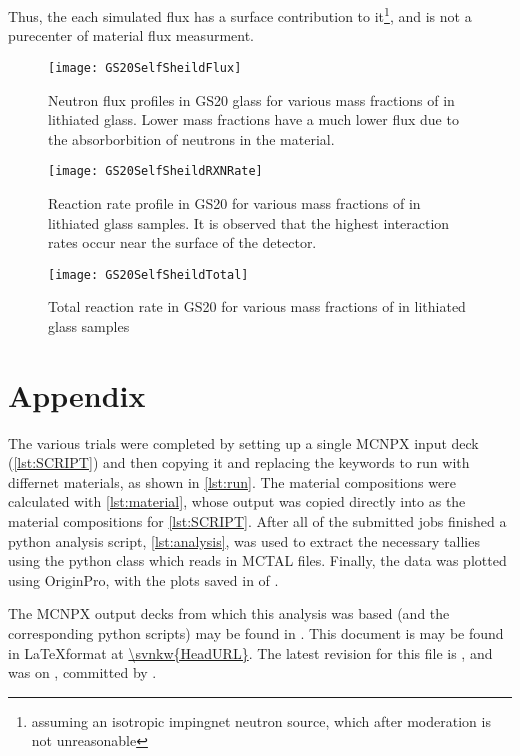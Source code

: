 \documentclass[draftcls,onecolumn]{IEEEtran}
\begin{document}
Thus, the each simulated flux has a surface contribution to it\footnote{assuming an isotropic impingnet neutron source, which after moderation is not unreasonable}, and is not a purecenter of material flux measurment.
\begin{figure}
	\texttt{[image: GS20SelfSheildFlux]}
	\caption[Flux Profile through GS20]{Neutron flux profiles in GS20 glass for various mass fractions of  in lithiated glass. Lower mass fractions have a much lower flux due to the absorborbition of neutrons in the material.}
	\label{fig:Flux}
\end{figure}
\begin{figure}
	\texttt{[image: GS20SelfSheildRXNRate]}
	\caption[Reaction Rate through GS20]{Reaction rate profile in GS20 for various mass fractions of  in lithiated glass samples. It is observed that the highest interaction rates occur near the surface of the detector.}
	\label{fig:RxnRate}
\end{figure}
\begin{figure}
	\texttt{[image: GS20SelfSheildTotal]}
	\caption[Total Reaction Rate]{Total reaction rate in GS20 for various mass fractions of  in lithiated glass samples}
	\label{fig:TotalRxn}
\end{figure}

\section{Appendix}
\label{sec:Appendix}
The various trials were completed by setting up a single MCNPX input deck (\autoref{lst:SCRIPT}) and then copying it and replacing the keywords to run with differnet materials, as shown in \autoref{lst:run}.
The material compositions were calculated with \autoref{lst:material}, whose output was copied directly into as the material compositions for \autoref{lst:SCRIPT}.
After all of the submitted jobs finished a python analysis script, \autoref{lst:analysis}, was used to extract the necessary tallies
using the  python class which reads in MCTAL files.
Finally, the data was plotted using OriginPro, with the plots saved in  of .





The MCNPX output decks from which this analysis was based (and the corresponding python scripts) may be found in .
This document is may be found in \LaTeX format at \url{\svnkw{HeadURL}}.  
The latest revision for this file is \svnrev, and was on \svndate, committed by \svnauthor.
\end{document}
